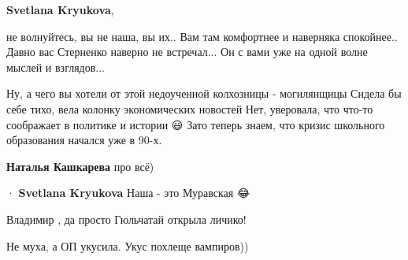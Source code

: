 \begin{itemize}
\begin{itemize}
\textbf{Svetlana Kryukova}, 

не волнуйтесь, вы не наша, вы их.. Вам там комфортнее и наверняка спокойнее..
Давно вас Стерненко наверно не встречал... Он с вами уже на одной волне мыслей
и взглядов...

 

Ну, а чего вы хотели от этой недоученной колхозницы - могилянщицы \Smiley[1.0][yellow] Сидела бы
себе тихо, вела колонку экономических новостей \Smiley[1.0][yellow] Нет, уверовала, что что-то
соображает в политике и истории 😃 Зато теперь знаем, что кризис школьного
образования начался уже в 90-х.

 
\textbf{Наталья Кашкарева} про всё)

 
  · 
\textbf{Svetlana Kryukova} Наша - это Муравская 😂

 
Владимир , да просто Гюльчатай открыла личико!

 
Не муха, а ОП укусила.
Укус похлеще вампиров))

 

\end{itemize}
\end{itemize}
